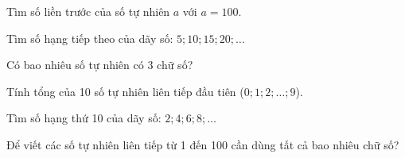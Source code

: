 \begin{ex} %
Tìm số liền trước của số tự nhiên $a$ với $a = 100$.
\end{ex}

\begin{ex} %
Tìm số hạng tiếp theo của dãy số: $5; 10; 15; 20; \dots$
\end{ex}

\begin{ex} %
Có bao nhiêu số tự nhiên có 3 chữ số?
\end{ex}

\begin{ex} %
Tính tổng của 10 số tự nhiên liên tiếp đầu tiên ($0; 1; 2; \dots; 9$).
\end{ex}

\begin{ex} %
Tìm số hạng thứ 10 của dãy số: $2; 4; 6; 8; \dots$
\end{ex}

\begin{ex} %
Để viết các số tự nhiên liên tiếp từ 1 đến 100 cần dùng tất cả bao nhiêu chữ số?
\end{ex}

